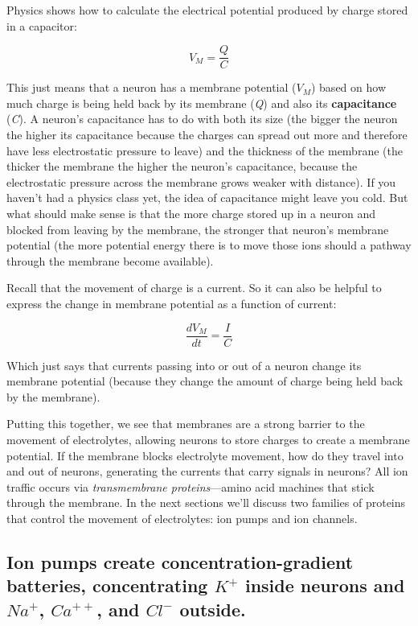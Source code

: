 \documentclass[
]{book}
\begin{document}
Physics shows how to calculate the electrical potential produced by charge stored in a capacitor:

\[V_{M} = \frac{Q}{C}\]

This just means that a neuron has a membrane potential (\(V_{M}\)) based on how much charge is being held back by its membrane (\emph{Q}) and also its \textbf{capacitance} (\emph{C}). A neuron's capacitance has to do with both its size (the bigger the neuron the higher its capacitance because the charges can spread out more and therefore have less electrostatic pressure to leave) and the thickness of the membrane (the thicker the membrane the higher the neuron's capacitance, because the electrostatic pressure across the membrane grows weaker with distance). If you haven't had a physics class yet, the idea of capacitance might leave you cold. But what should make sense is that the more charge stored up in a neuron and blocked from leaving by the membrane, the stronger that neuron's membrane potential (the more potential energy there is to move those ions should a pathway through the membrane become available).

Recall that the movement of charge is a current. So it can also be helpful to express the change in membrane potential as a function of current:

\[\frac{dV_{M}}{dt} = \frac{I}{C}\]

Which just says that currents passing into or out of a neuron change its membrane potential (because they change the amount of charge being held back by the membrane).

Putting this together, we see that membranes are a strong barrier to the movement of electrolytes, allowing neurons to store charges to create a membrane potential. If the membrane blocks electrolyte movement, how do they travel into and out of neurons, generating the currents that carry signals in neurons? All ion traffic occurs via \emph{transmembrane proteins}---amino acid machines that stick through the membrane. In the next sections we'll discuss two families of proteins that control the movement of electrolytes: ion pumps and ion channels.

\hypertarget{ion-pumps-create-concentration-gradient-batteries-concentrating-k-inside-neurons-and-na-ca-and-cl--outside.}{%
\subsection{\texorpdfstring{Ion pumps create concentration-gradient batteries, concentrating \(K^+\) inside neurons and \(Na^+\), \(Ca^{++}\), and \(Cl^{-}\) outside.}{Ion pumps create concentration-gradient batteries, concentrating K\^{}+ inside neurons and Na\^{}+, Ca\^{}\{++\}, and Cl\^{}\{-\} outside.}}\label{ion-pumps-create-concentration-gradient-batteries-concentrating-k-inside-neurons-and-na-ca-and-cl--outside.}}
\end{document}
